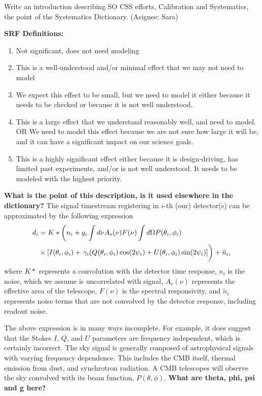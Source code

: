 Write an introduction describing SO CSS efforts, Calibration and Systematics, the point of the Systematics Dictionary. (Asignee: Sara)

\textbf{SRF Definitions:}
\begin{enumerate}
\item Not significant, does not need modeling
\item This is a well-understood and/or minimal effect that we may not need to model
\item We expect this effect to be small, but we need to model it either because it needs to be checked or because it is not well understood.
\item This is a large effect that we understand reasonably well, and need to model. OR We need to model this effect because we are not sure how large it will be, and it can have a significant impact on our science goals.
\item This is a highly significant effect either because it is design-driving, has limited past experiments, and/or is not well understood. It needs to be modeled with the highest priority.
\end{enumerate}


\textbf{What is the point of this description, is it used elsewhere in the dictionary?}
The signal timestream registering in \textbf{$i$}-th (our) detector(s) can be approximated by the following expression
\begin{equation}
\begin{split}
d _i &= K \ast \left( n_i + g_i \int d \nu A_\mathrm{e} (\nu) F(\nu) \int d\Omega P (\theta _i,\phi _i) \right. \\ 
&\times [I(\theta _i, \phi _i) + \left. \gamma _i (Q(\theta _i,\phi _i)\cos (2\psi _i) + U(\theta _i,\phi _i) \sin (2\psi _i) ]  \vphantom{\int } \right) + \tilde{n}_i,
\end{split}
\end{equation}
where $K \ast$ represents a convolution with the detector time response, $n_i$ is the noise, which we assume is uncorrelated with signal, $A_{\mathrm{e}} (\nu)$ represents the effective area of the telescope, $F(\nu)$ is the spectral responsivity, and $\tilde{n}_i$ represents noise terms that are not convolved by the detector response, including readout noise. 

The above expression is in many ways incomplete. For example, it does suggest that the Stokes $I$, $Q$, and $U$ parameters are frequency independent, which is certainly incorrect. The sky signal is generally composed of astrophysical signals with varying frequency dependence. This includes the CMB itself, thermal emission from dust, and synchrotron radiation. A CMB telescopes will observe the sky convolved with its beam function, $P(\theta, \phi)$. \textbf{What are theta, phi, psi and g here?}
